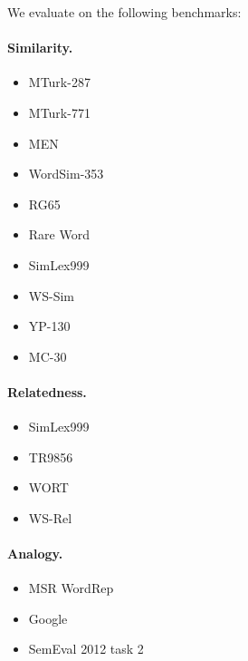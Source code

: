 \documentclass{article}
\begin{document}
    We evaluate on the following benchmarks:
    
    \paragraph{Similarity.}
    
    \begin{itemize}
        \item MTurk-287 \cite{radinsky2011word}
        \item MTurk-771 \cite{halawi2012large}
        \item MEN \cite{bruni2012distributional}
        \item WordSim-353 \cite{finkelstein2001placing}
        \item RG65
        \item Rare Word \cite{luong2013better}
        \item SimLex999 \cite{hill2015simlex}
        \item WS-Sim \cite{agirre2009study}
        \item YP-130 \cite{yang2006verb}
        \item MC-30 \cite{miller1991contextual}
    \end{itemize}
    
    \paragraph{Relatedness.}
    
    \begin{itemize}
        \item SimLex999 \cite{hill2015simlex}
        \item TR9856 \cite{levy2015tr9856}
        \item WORT
        \item WS-Rel \cite{agirre2009study}
    \end{itemize}
    
    \paragraph{Analogy.}
    
    \begin{itemize}
        \item MSR WordRep
        \item Google
        \item SemEval 2012 task 2
    \end{itemize}
    
\end{document}
